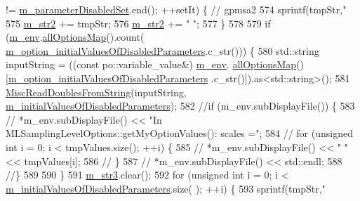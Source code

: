 \begin{DoxyCode}
{       != \hyperlink{class_q_u_e_s_o_1_1_m_l_sampling_level_options_a0c5c308a5b9e0150be59ad52a48e6ab9}{m\_parameterDisabledSet}.end(); ++setIt) \{ \textcolor{comment}{// gpmsa2}
574     sprintf(tmpStr,\textcolor{stringliteral}{"%
575     \hyperlink{class_q_u_e_s_o_1_1_m_l_sampling_level_options_ab91c7af5bfcfeb0466970713e2655e3a}{m\_str2} += tmpStr;
576     \hyperlink{class_q_u_e_s_o_1_1_m_l_sampling_level_options_ab91c7af5bfcfeb0466970713e2655e3a}{m\_str2} += \textcolor{stringliteral}{" "};
577   \}
578 
579   \textcolor{keywordflow}{if} (\hyperlink{class_q_u_e_s_o_1_1_m_l_sampling_level_options_a5bdc1fb3f6eb46f73feec9c356c9a1b8}{m\_env}.\hyperlink{class_q_u_e_s_o_1_1_base_environment_ae7cee155956e0e70112f45e2ad1f02c8}{allOptionsMap}().count(
      \hyperlink{class_q_u_e_s_o_1_1_m_l_sampling_level_options_ab96236f77ecc1033bcdecbddced0c60f}{m\_option\_initialValuesOfDisabledParameters}.c\_str())) \{
580     std::string inputString = ((\textcolor{keyword}{const} po::variable\_value&) \hyperlink{class_q_u_e_s_o_1_1_m_l_sampling_level_options_a5bdc1fb3f6eb46f73feec9c356c9a1b8}{m\_env}.
      \hyperlink{class_q_u_e_s_o_1_1_base_environment_ae7cee155956e0e70112f45e2ad1f02c8}{allOptionsMap}()[\hyperlink{class_q_u_e_s_o_1_1_m_l_sampling_level_options_ab96236f77ecc1033bcdecbddced0c60f}{m\_option\_initialValuesOfDisabledParameters}
      .c\_str()]).as<std::string>();
581     \hyperlink{namespace_q_u_e_s_o_ac3fab438679d1dc864f8d629881dad2e}{MiscReadDoublesFromString}(inputString,
      \hyperlink{class_q_u_e_s_o_1_1_m_l_sampling_level_options_a50cbdab5fe9fbda97aca16d206888a18}{m\_initialValuesOfDisabledParameters});
582     \textcolor{comment}{//if (m\_env.subDisplayFile()) \{}
583     \textcolor{comment}{//  *m\_env.subDisplayFile() << "In MLSamplingLevelOptions::getMyOptionValues(): scales =";}
584     \textcolor{comment}{//  for (unsigned int i = 0; i < tmpValues.size(); ++i) \{}
585     \textcolor{comment}{//    *m\_env.subDisplayFile() << " " << tmpValues[i];}
586     \textcolor{comment}{//  \}}
587     \textcolor{comment}{//  *m\_env.subDisplayFile() << std::endl;}
588     \textcolor{comment}{//\}}
589 
590   \}
591   \hyperlink{class_q_u_e_s_o_1_1_m_l_sampling_level_options_ab373068cdb371c781603dbb2b75ae14d}{m\_str3}.clear();
592   \textcolor{keywordflow}{for} (\textcolor{keywordtype}{unsigned} \textcolor{keywordtype}{int} i = 0; i < \hyperlink{class_q_u_e_s_o_1_1_m_l_sampling_level_options_a50cbdab5fe9fbda97aca16d206888a18}{m\_initialValuesOfDisabledParameters}.size(
      ); ++i) \{
593     sprintf(tmpStr,\textcolor{stringliteral}{"%
}}}
\end{DoxyCode}
